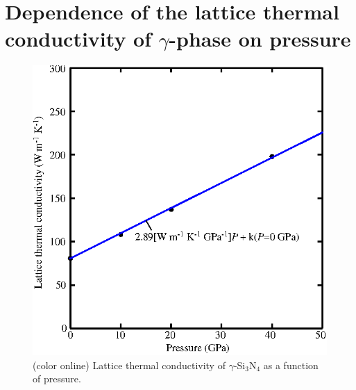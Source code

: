 \documentclass[twocolumn,amsmath,amssymb,a4paper,prb,superscriptaddress,floatfix]{revtex4-1}
\begin{document}
\section{Dependence of the lattice thermal conductivity of $\gamma$-phase on
pressure}
\begin{figure}[ht]
 \begin{center}
  \includegraphics[width=0.80\linewidth]{S1.eps} \caption{(color online)
  Lattice thermal conductivity of $\gamma$-Si$_3$N$_4$ as a function of pressure.  \label{fig:S1} }
 \end{center}
\end{figure}

\end{document}
